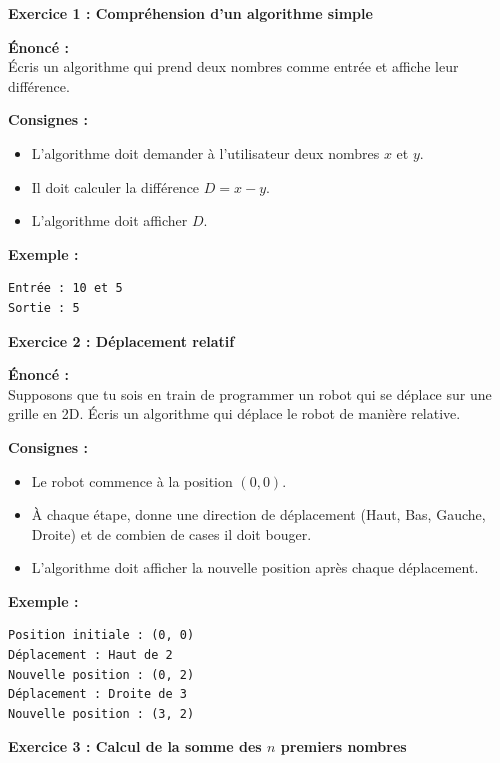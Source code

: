 \documentclass{article}
\begin{document}
\begin{tcolorbox}[colback=green!10!white, colframe=yellow!75!black, title=\textcolor{white}{Exercices}]

\textbf{Exercice 1 : Compréhension d'un algorithme simple}

\textbf{Énoncé :} \\
Écris un algorithme qui prend deux nombres comme entrée et affiche leur différence.

\textbf{Consignes :}
\begin{itemize}
    \item L'algorithme doit demander à l'utilisateur deux nombres \( x \) et \( y \).
    \item Il doit calculer la différence \( D = x - y \).
    \item L'algorithme doit afficher \( D \).
\end{itemize}

\textbf{Exemple :}
\begin{verbatim}
Entrée : 10 et 5
Sortie : 5
\end{verbatim}

\vspace{0.5cm}

\textbf{Exercice 2 : Déplacement relatif}

\textbf{Énoncé :} \\
Supposons que tu sois en train de programmer un robot qui se déplace sur une grille en 2D. Écris un algorithme qui déplace le robot de manière relative.

\textbf{Consignes :}
\begin{itemize}
    \item Le robot commence à la position \( (0, 0) \).
    \item À chaque étape, donne une direction de déplacement (Haut, Bas, Gauche, Droite) et de combien de cases il doit bouger.
    \item L'algorithme doit afficher la nouvelle position après chaque déplacement.
\end{itemize}

\textbf{Exemple :}
\begin{verbatim}
Position initiale : (0, 0)
Déplacement : Haut de 2
Nouvelle position : (0, 2)
Déplacement : Droite de 3
Nouvelle position : (3, 2)
\end{verbatim}

\vspace{0.5cm}

\textbf{Exercice 3 : Calcul de la somme des \( n \) premiers nombres}


\end{tcolorbox}
\end{document}

